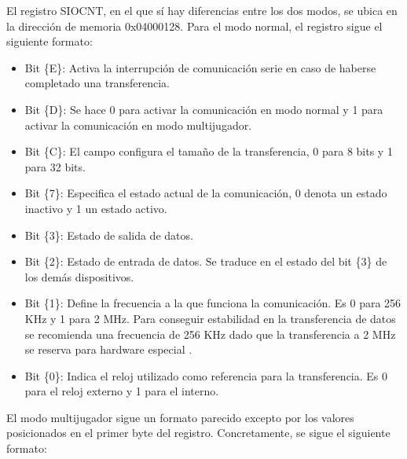{El registro SIOCNT, en el que sí hay diferencias entre los dos modos, se ubica en la dirección de memoria 0x04000128. Para el modo normal, el registro sigue el siguiente formato:

\begin{itemize}
	\item Bit \{E\}: Activa la interrupción de comunicación serie en caso de haberse completado una transferencia.
	\item Bit \{D\}: Se hace 0 para activar la comunicación en modo normal y 1 para activar la comunicación en modo multijugador.
	\item Bit \{C\}: El campo configura el tamaño de la transferencia, 0 para 8 bits y 1 para 32 bits.
	\item Bit \{7\}: Especifica el estado actual de la comunicación, 0 denota un estado inactivo y 1 un estado activo.
	\item Bit \{3\}: Estado de salida de datos.
	\item Bit \{2\}: Estado de entrada de datos. Se traduce en el estado del bit \{3\} de los demás dispositivos.
	\item Bit \{1\}: Define la frecuencia a la que funciona la comunicación. Es 0 para 256 KHz y 1 para 2 MHz. Para conseguir estabilidad en la transferencia de datos se recomienda una frecuencia de 256 KHz dado que la transferencia a 2 MHz se reserva para hardware especial \cite{bib:gbatek}.
	\item Bit \{0\}: Indica el reloj utilizado como referencia para la transferencia. Es 0 para el reloj externo y 1 para el interno.
\end{itemize}

El modo multijugador sigue un formato parecido excepto por los valores posicionados en el primer byte del registro. Concretamente, se sigue el siguiente formato:

}
